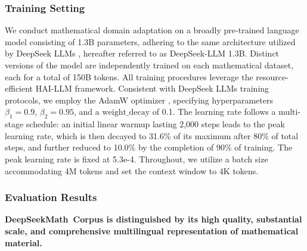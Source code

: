 \subsubsection{Training Setting}
\label{sec:quality-policy}
We conduct mathematical domain adaptation on a broadly pre-trained language model consisting of 1.3B parameters, adhering to the same architecture utilized by DeepSeek LLMs \citep{deepseek-llm}, hereafter referred to as DeepSeek-LLM 1.3B. Distinct versions of the model are independently trained on each mathematical dataset, each for a total of 150B tokens. All training procedures leverage the resource-efficient HAI-LLM \citep{haillm} framework. Consistent with DeepSeek LLMs training protocols, we employ the AdamW optimizer \citep{adamW}, specifying hyperparameters $\beta_1=0.9$, $\beta_2=0.95$, and a $\mathrm{weight\_decay}$ of 0.1. The learning rate follows a multi-stage schedule: an initial linear warmup lasting 2,000 steps leads to the peak learning rate, which is then decayed to 31.6\% of its maximum after 80\% of total steps, and further reduced to 10.0\% by the completion of 90\% of training. The peak learning rate is fixed at 5.3e-4. Throughout, we utilize a batch size accommodating 4M tokens and set the context window to 4K tokens.

\subsubsection{Evaluation Results}

\textbf{DeepSeekMath~Corpus is distinguished by its high quality, substantial scale, and comprehensive multilingual representation of mathematical material.}

